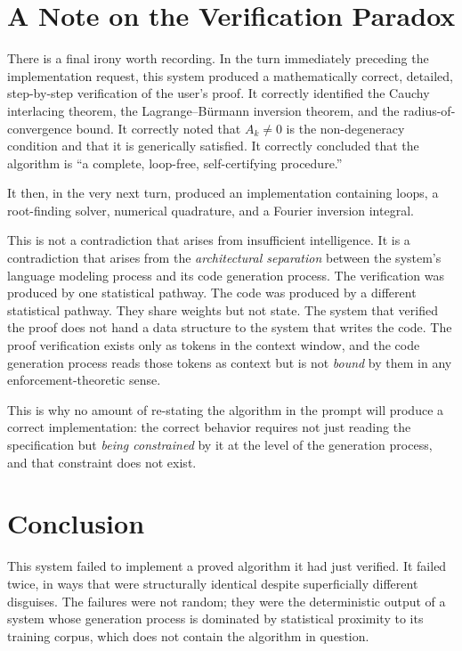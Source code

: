 \documentclass{article}
\newcommand{\tmem}[1]{{\em #1\/}}
\begin{document}
\section{A Note on the Verification Paradox}

There is a final irony worth recording. In the turn immediately preceding the
implementation request, this system produced a mathematically correct,
detailed, step-by-step verification of the user's proof. It correctly
identified the Cauchy interlacing theorem, the Lagrange--B{\"u}rmann inversion
theorem, and the radius-of-convergence bound. It correctly noted that $A_k
\neq 0$ is the non-degeneracy condition and that it is generically satisfied.
It correctly concluded that the algorithm is ``a complete, loop-free,
self-certifying procedure.''

It then, in the very next turn, produced an implementation containing loops, a
root-finding solver, numerical quadrature, and a Fourier inversion integral.

This is not a contradiction that arises from insufficient intelligence. It is
a contradiction that arises from the {\tmem{architectural separation}} between
the system's language modeling process and its code generation process. The
verification was produced by one statistical pathway. The code was produced by
a different statistical pathway. They share weights but not state. The system
that verified the proof does not hand a data structure to the system that
writes the code. The proof verification exists only as tokens in the context
window, and the code generation process reads those tokens as context but is
not {\tmem{bound}} by them in any enforcement-theoretic sense.

This is why no amount of re-stating the algorithm in the prompt will produce a
correct implementation: the correct behavior requires not just reading the
specification but {\tmem{being constrained}} by it at the level of the
generation process, and that constraint does not exist.

\section{Conclusion}

This system failed to implement a proved algorithm it had just verified. It
failed twice, in ways that were structurally identical despite superficially
different disguises. The failures were not random; they were the deterministic
output of a system whose generation process is dominated by statistical
proximity to its training corpus, which does not contain the algorithm in
question.
\end{document}
